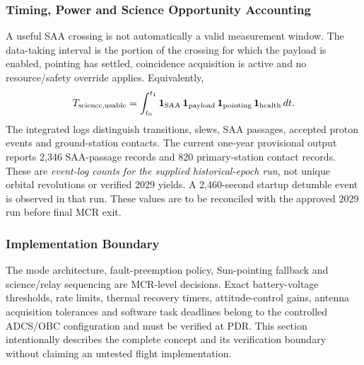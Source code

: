 \subsubsection{Timing, Power and Science Opportunity Accounting}\label{app:op-logic-accounting}
A useful SAA crossing is not automatically a valid measurement window. The data-taking interval is the portion of the crossing for which the payload is enabled, pointing has settled, coincidence acquisition is active and no resource/safety override applies. Equivalently,
\begin{equation}
T_{\rm science,usable}=\int_{t_0}^{t_1}\mathbf{1}_{\rm SAA}\,\mathbf{1}_{\rm payload}\,\mathbf{1}_{\rm pointing}\,\mathbf{1}_{\rm health}\,dt.
\end{equation}
The integrated logs distinguish transitions, slews, SAA passages, accepted proton events and ground-station contacts. The current one-year provisional output reports 2,346 SAA-passage records and 820 primary-station contact records. These are \emph{event-log counts for the supplied historical-epoch run}, not unique orbital revolutions or verified 2029 yields. A 2,460-second startup detumble event is observed in that run. These values are to be reconciled with the approved 2029 run before final MCR exit.

\subsubsection{Implementation Boundary}\label{app:op-logic-note}
The mode architecture, fault-preemption policy, Sun-pointing fallback and science/relay sequencing are MCR-level decisions. Exact battery-voltage thresholds, rate limits, thermal recovery timers, attitude-control gains, antenna acquisition tolerances and software task deadlines belong to the controlled ADCS/OBC configuration and must be verified at PDR. This section intentionally describes the complete concept and its verification boundary without claiming an untested flight implementation.
